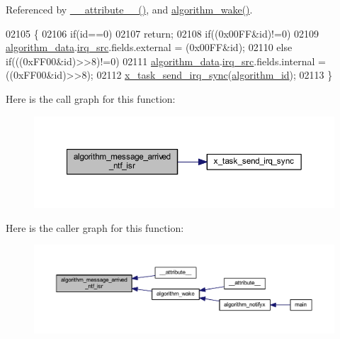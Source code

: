 Referenced by \hyperlink{a00030_source_l00658}{\+\_\+\+\_\+attribute\+\_\+\+\_\+()}, and \hyperlink{a00038_source_l00670}{algorithm\+\_\+wake()}.


\begin{DoxyCode}
02105 \{
02106     \textcolor{keywordflow}{if}(\textcolor{keywordtype}{id}==0)
02107         \textcolor{keywordflow}{return};
02108     \textcolor{keywordflow}{if}((0x00FF&\textcolor{keywordtype}{id})!=0)
02109     \hyperlink{a00038_a183caa40cd01e79ee309cc9c4a225197}{algorithm\_data}.\hyperlink{a00016_a1aafd556b3c9ed3e5295b17dbd80cab8}{irq\_src}.fields.external = (0x00FF&id);
02110     \textcolor{keywordflow}{else} \textcolor{keywordflow}{if}(((0xFF00&\textcolor{keywordtype}{id})>>8)!=0)
02111     \hyperlink{a00038_a183caa40cd01e79ee309cc9c4a225197}{algorithm\_data}.\hyperlink{a00016_a1aafd556b3c9ed3e5295b17dbd80cab8}{irq\_src}.fields.internal = ((0xFF00&\textcolor{keywordtype}{id})>>8);
02112     \hyperlink{a00036_a9953756bc7c83e5f2c36830396136e75}{x\_task\_send\_irq\_sync}(\hyperlink{a00038_aff3e3d622fcd96787628167d3c1856f9}{algorithm\_id});
02113 \}
\end{DoxyCode}


Here is the call graph for this function\+:\nopagebreak
\begin{figure}[H]
\begin{center}
\leavevmode
\includegraphics[width=350pt]{de/d11/a00021_a85471d58eae93d5d7e7e2b52e2b915d3_cgraph}
\end{center}
\end{figure}




Here is the caller graph for this function\+:\nopagebreak
\begin{figure}[H]
\begin{center}
\leavevmode
\includegraphics[width=350pt]{de/d11/a00021_a85471d58eae93d5d7e7e2b52e2b915d3_icgraph}
\end{center}
\end{figure}


